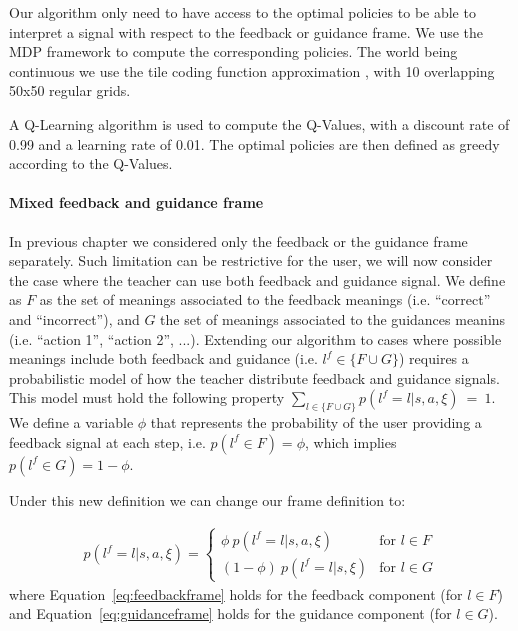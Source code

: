 Our algorithm only need to have access to the optimal policies to be able to interpret a signal with respect to the feedback or guidance frame. We use the MDP framework to compute the corresponding policies. The world being continuous we use the tile coding function approximation \cite{sutton1998reinforcement}, with 10 overlapping 50x50 regular grids. 

A Q-Learning algorithm \cite{watkins1992q} is used to compute the Q-Values, with a discount rate of 0.99 and a learning rate of 0.01. The  optimal policies are then defined as greedy according to the Q-Values.

\paragraph{Mixed feedback and guidance frame}

In previous chapter we considered only the feedback or the guidance frame separately. Such limitation can be restrictive for the user, we will now consider the case where the teacher can use both feedback and guidance signal. We define as $F$ as the set of meanings associated to the feedback meanings (i.e. ``correct'' and ``incorrect''), and $G$ the set of meanings associated to the guidances meanins (i.e. ``action 1'', ``action 2'', ...). Extending our algorithm to cases where possible meanings include both feedback and guidance (i.e. $l^f \in \{F \cup G\}$) requires a probabilistic model of how the teacher distribute feedback and guidance signals. This model must hold the following property $\sum_{l \in \{F \cup G\}} p(l^f = l|s,a,\xi)~=~1$. We define a variable $\phi$ that represents the probability of the user providing a feedback signal at each step, i.e. $p(l^f \in F) = \phi$, which implies $p(l^f \in G) = 1 - \phi$. 

Under this new definition we can change our frame definition to:

\begin{eqnarray}
    p(l^f = l|s,a,\xi) = 
        \begin{cases} 
            \phi~p(l^f = l|s,a,\xi) &\mbox{for } l \in F \\
            (1- \phi)~p(l^f = l|s,\xi) & \mbox{for } l \in G
        \end{cases}
        \label{eq:mixedfeedbackguidance}
\end{eqnarray}
where Equation~\ref{eq:feedbackframe} holds for the feedback component (for $l \in F$) and Equation~\ref{eq:guidanceframe} holds for the guidance component (for $l \in G$). 

